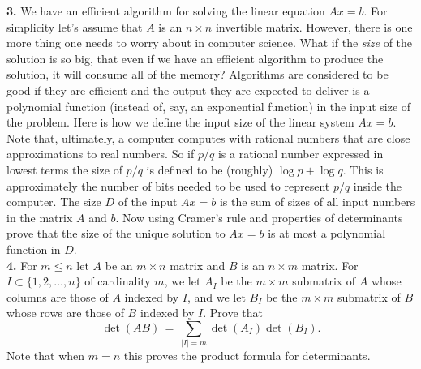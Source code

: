 \documentclass[11pt]{amsart}
\theoremstyle{definition}  %
\begin{document}
\vskip 0.1cm
\noindent 
{\bf 3.}  We have an efficient algorithm for solving the linear equation $Ax = b$. For simplicity let's assume that $A$ is an $n \times n$ invertible matrix.
However, there is one more thing one needs to worry about in computer science. What if the {\it size} of the solution is so big, that even if we have
an efficient algorithm to produce the solution, it will consume all of the memory? Algorithms are considered to be good if they are efficient
and the output they are expected to deliver is a polynomial function (instead of, say, an exponential function) in the input size of the problem. Here is how we define
the input size of the linear system $Ax = b$. Note that, ultimately, a computer computes with rational numbers that are close approximations to real numbers. 
So if $p/q$ is a rational number expressed in lowest terms the size of $p/q$ is defined to be (roughly) $\log p + \log q$. This is approximately
the number of bits needed to be used to represent $p/q$ inside the computer. The size $D$ of the input $Ax = b$ is the sum of sizes of all input 
numbers in the matrix $A$ and $b$. Now using Cramer's rule and properties of determinants prove that the size of the unique solution 
to $Ax = b$ is at most a polynomial function in $D$. \\

\vskip 0.1cm
\noindent
{\bf 4.} For $m \leq n$ let $A$ be an $m \times n$ matrix and $B$ is an $n \times m$ matrix. For $I \subset \{1,2, \ldots , n\}$ of cardinality $m$, we let $A_I$ be the 
$m \times m$ submatrix of $A$ whose columns are those of $A$ indexed by $I$, and we let $B_I$ be the $m \times m$ submatrix of $B$ whose rows are those of $B$ indexed by $I$.
Prove that 
$$ \det(AB) \, = \, \sum_{|I| = m} \det(A_I)\det(B_I).$$
Note that when $m=n$ this proves the product formula for determinants.
\end{document}
